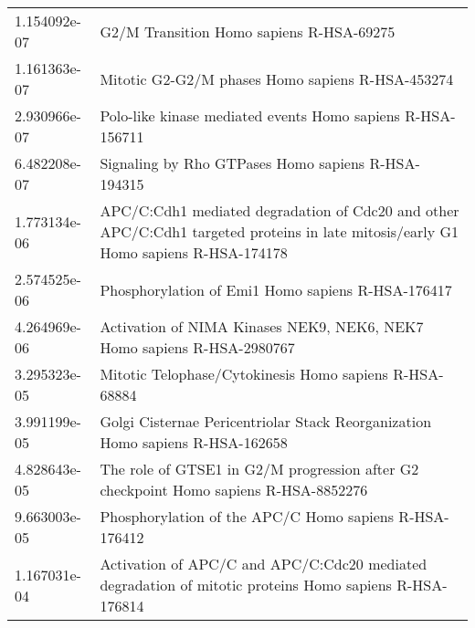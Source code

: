 \begin{longtable}{p{2.4cm}p{14.5cm}}
             1.154092e-07 &                                                                                                               G2/M Transition Homo sapiens R-HSA-69275 \\
             1.161363e-07 &                                                                                                       Mitotic G2-G2/M phases Homo sapiens R-HSA-453274 \\
             2.930966e-07 &                                                                                             Polo-like kinase mediated events Homo sapiens R-HSA-156711 \\
             6.482208e-07 &                                                                                                     Signaling by Rho GTPases Homo sapiens R-HSA-194315 \\
             1.773134e-06 &                     APC/C:Cdh1 mediated degradation of Cdc20 and other APC/C:Cdh1 targeted proteins in late mitosis/early G1 Homo sapiens R-HSA-174178 \\
             2.574525e-06 &                                                                                                      Phosphorylation of Emi1 Homo sapiens R-HSA-176417 \\
             4.264969e-06 &                                                                                 Activation of NIMA Kinases NEK9, NEK6, NEK7 Homo sapiens R-HSA-2980767 \\
             3.295323e-05 &                                                                                                 Mitotic Telophase/Cytokinesis Homo sapiens R-HSA-68884 \\
             3.991199e-05 &                                                                          Golgi Cisternae Pericentriolar Stack Reorganization Homo sapiens R-HSA-162658 \\
             4.828643e-05 &                                                                   The role of GTSE1 in G2/M progression after G2 checkpoint Homo sapiens R-HSA-8852276 \\
             9.663003e-05 &                                                                                                 Phosphorylation of the APC/C Homo sapiens R-HSA-176412 \\
             1.167031e-04 &                                                 Activation of APC/C and APC/C:Cdc20 mediated degradation of mitotic proteins Homo sapiens R-HSA-176814 \\

\end{longtable}
